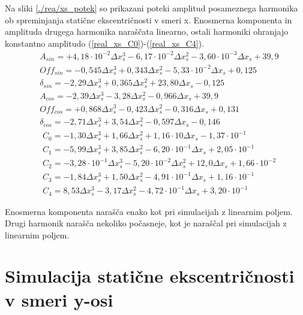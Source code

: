 Na sliki \ref{./rea/xs_potek} so prikazani poteki amplitud posameznega harmonika ob spreminjanja statične ekscentričnosti v smeri x. Enosmerna komponenta in amplituda drugega harmonika naraščata linearno, ostali harmoniki ohranjajo konstantno amplitudo (\ref{real_xs_C0})-(\ref{real_xs_C4}).
\begin{eqnarray}
&A_{sin} = +4,18\cdot 10^{-2}\Delta x_s^3-6,17\cdot 10^{-2}\Delta x_s^2-3,60\cdot 10^{-3}\Delta x_s+39,9\\     
&Off_{sin} = -0,545\Delta x_s^3+0,343\Delta x_s^2-5,33\cdot 10^{-2}\Delta x_s+0,125\\   
&\delta_{sin} = -2,29\Delta x_s^3+0,365\Delta x_s^2+23,80\Delta x_s-0,125\\
&A_{cos} = -2,39\Delta x_s^3-3,28\Delta x_s^2-0,966\Delta x_s+39,9\\     
&Off_{cos} = +0,868\Delta x_s^3-0,423\Delta x_s^2-0,316\Delta x_s+0,131\\   
&\delta_{cos} = -2,71\Delta x_s^3+3,54\Delta x_s^2-0,597\Delta x_s-0,146
\end{eqnarray}
\begin{eqnarray}\label{real_xs_C0}
&C_0 =-1,30\Delta x_s^{3}+1,66\Delta x_s^{2}+1,16\cdot 10\Delta x_s-1,37\cdot 10^{-1} \\                          
&C_1 =-5,99\Delta x_s^{3}+3,85\Delta x_s^{2}-6,20\cdot 10^{-1}\Delta x_s+2,05\cdot 10^{-1} \\                     
&C_2 =-3,28\cdot 10^{-1}\Delta x_s^{3}-5,20\cdot 10^{-2}\Delta x_s^{2}+12,0\Delta x_s+1,66\cdot 10^{-2} \\
&C_3 =-1,84\Delta x_s^{3}+1,50\Delta x_s^{2}-4,91\cdot 10^{-1}\Delta x_s+1,16\cdot 10^{-1} \\
\label{real_xs_C4}                     
&C_4 =8,53\Delta x_s^{3}-3,17\Delta x_s^{2}-4,72\cdot 10^{-1}\Delta x_s+3,20\cdot 10^{-1}
\end{eqnarray}

Enosmerna komponenta narašča enako kot pri simulacijah z linearnim poljem. Drugi harmonik narašča nekoliko počasneje, kot je naraščal pri simulacijah z linearnim poljem. 

\section{Simulacija statične ekscentričnosti v smeri y-osi}


